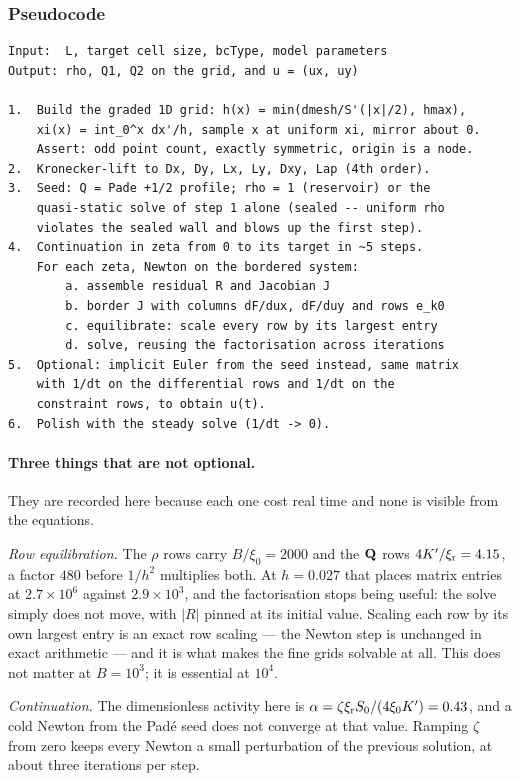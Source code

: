 \documentclass[a5paper]{article}
\begin{document}
\subsubsection{Pseudocode}
\begin{verbatim}
Input:  L, target cell size, bcType, model parameters
Output: rho, Q1, Q2 on the grid, and u = (ux, uy)

1.  Build the graded 1D grid: h(x) = min(dmesh/S'(|x|/2), hmax),
    xi(x) = int_0^x dx'/h, sample x at uniform xi, mirror about 0.
    Assert: odd point count, exactly symmetric, origin is a node.
2.  Kronecker-lift to Dx, Dy, Lx, Ly, Dxy, Lap (4th order).
3.  Seed: Q = Pade +1/2 profile; rho = 1 (reservoir) or the
    quasi-static solve of step 1 alone (sealed -- uniform rho
    violates the sealed wall and blows up the first step).
4.  Continuation in zeta from 0 to its target in ~5 steps.
    For each zeta, Newton on the bordered system:
        a. assemble residual R and Jacobian J
        b. border J with columns dF/dux, dF/duy and rows e_k0
        c. equilibrate: scale every row by its largest entry
        d. solve, reusing the factorisation across iterations
5.  Optional: implicit Euler from the seed instead, same matrix
    with 1/dt on the differential rows and 1/dt on the
    constraint rows, to obtain u(t).
6.  Polish with the steady solve (1/dt -> 0).
\end{verbatim}

\paragraph{Three things that are not optional.} They are recorded here because each one cost real time and none is visible from the equations.

\emph{Row equilibration.} The $\rho$ rows carry $B/\xi_0 = 2000$ and the $\mathbf{Q}$ rows $4K'/\xi_{\rm r} = 4.15$, a factor $480$ before $1/h^2$ multiplies both. At $h = 0.027$ that places matrix entries at $2.7\times10^6$ against $2.9\times10^3$, and the factorisation stops being useful: the solve simply does not move, with $|R|$ pinned at its initial value. Scaling each row by its own largest entry is an exact row scaling --- the Newton step is unchanged in exact arithmetic --- and it is what makes the fine grids solvable at all. This does not matter at $B = 10^3$; it is essential at $10^4$.

\emph{Continuation.} The dimensionless activity here is $\alpha = \zeta\xi_{\rm r} S_0/(4\xi_0 K') = 0.43$, and a cold Newton from the Pad\'e seed does not converge at that value. Ramping $\zeta$ from zero keeps every Newton a small perturbation of the previous solution, at about three iterations per step.
\end{document}
